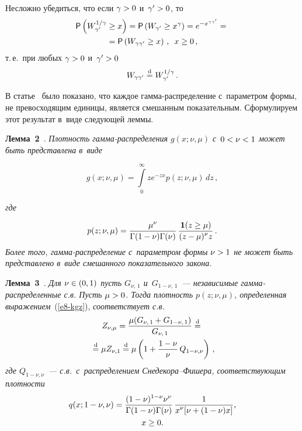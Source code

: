 \begin{multicols}{2}
Несложно убедиться, что если $\gamma\hm>0$ и~$\gamma'\hm>0$, то 
\begin{multline*}
{\sf P} \left(W_{\gamma'}^{1/\gamma}\ge x\right)=
{\sf P}\left(W_{\gamma'}\ge x^{\gamma}\right)=
e^{-x^{\gamma\gamma'}}={}\\
{}={\sf P}\left(W_{\gamma\gamma'}\ge x\right)\,,\enskip
x\ge 0\,,
\end{multline*}
 т.\,е.\ при любых $\gamma\hm>0$ и~$\gamma'\hm>0$
\begin{equation}
W_{\gamma\gamma'}\stackrel{\mathrm{d}}{=} W_{\gamma'}^{1/\gamma}\,.
\label{e7-kgz}
\end{equation}

В статье~\cite{Gleser1989} было показано, что каждое
гам\-ма-рас\-пре\-де\-ле\-ние с~параметром формы, не пре\-вос\-ходящим единицы,
является смешанным по\-ка\-зательным. Сформулируем этот результат в~виде\linebreak
сле\-ду\-ющей леммы.

\smallskip

\noindent
\textbf{Лемма~2}~\cite{Gleser1989}. \textit{Плотность гам\-ма-рас\-пре\-де\-ле\-ния
$g(x;\nu,\mu)$ с~$0\hm<\nu\hm<1$ может быть представлена в~виде}

\noindent
$$
g(x;\nu,\mu)=\int\limits_{0}^{\infty}ze^{-zx}p(z;\nu,\mu)\,dz\,,
$$

\vspace*{-2pt}

\noindent
\textit{где}

\noindent
\begin{equation}
p(z;\nu,\mu)=\displaystyle\frac{\displaystyle \mu^\nu\mathstrut}{\displaystyle \Gamma(1-\nu)\Gamma(\nu)\mathstrut}\,
\displaystyle\frac{\displaystyle \mathbf{1}(z\ge\mu)\mathstrut}{\displaystyle (z-\mu)^\nu z\mathstrut}\,.\label{e8-kgz}
\end{equation}
\textit{Более того, гам\-ма-рас\-пре\-де\-ле\-ние с~параметром формы $\nu\hm>1$ не может
быть представлено в~виде смешанного показательного закона.}

\smallskip

\noindent
\textbf{Лемма~3}~\cite{Korolev2017}. \textit{Для $\nu\hm\in(0,1)$ пусть
$G_{\nu,\,1}$ и~$G_{1-\nu,\,1}$~--- независимые гам\-ма-рас\-пре\-де\-лен\-ные
с.в. Пусть $\mu\hm>0$. Тогда плотность $p(z;\nu,\mu)$, определенная выражением}~(\ref{e8-kgz}), 
\textit{соответствует с.в.}
\begin{multline*}
Z_{\nu,\mu}=\displaystyle\frac{\displaystyle \mu(G_{\nu,\,1}+G_{1-\nu,\,1})\mathstrut}{\displaystyle G_{\nu,\,1}\mathstrut}\stackrel{\mathrm{d}}{=}{}\\
{}\stackrel{\mathrm{d}}{=} \mu
Z_{\nu,1}\stackrel{\mathrm{d}}{=}\mu\left(1+\displaystyle\frac{\displaystyle 1-\nu\mathstrut}{\displaystyle \nu\mathstrut}\, Q_{1-\nu,\nu}\right)\,,
\end{multline*}
\textit{где $Q_{1-\nu,\nu}$~--- с.в.\ с~распределением Сне\-де\-ко\-ра--Фи\-ше\-ра,
соответствующим плотности}
\begin{multline*}
q(x;1-\nu,\nu)=\displaystyle\frac{\displaystyle (1-\nu)^{1-\nu}\nu^\nu\mathstrut}{\displaystyle \Gamma(1-\nu)\Gamma(\nu)\mathstrut}
\,\displaystyle\frac{\displaystyle 1\mathstrut}{\displaystyle x^{\nu}[\nu+(1-\nu)x]\mathstrut},\\  x\ge0.
\end{multline*}



\end{multicols}
